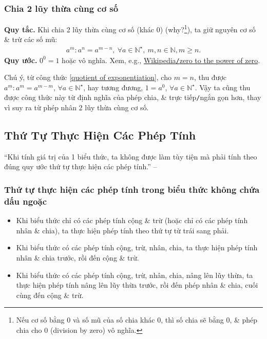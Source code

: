 \documentclass{article}
\numberwithin{equation}{section}
\begin{document}
\subsubsection{Chia 2 lũy thừa cùng cơ số}
\textbf{Quy tắc.} Khi chia 2 lũy thừa cùng cơ số (khác $0$) (why?\footnote{Nếu cơ số bằng 0 và số mũ của số chia khác 0, thì số chia sẽ bằng 0, \& phép chia cho 0 (division by zero) vô nghĩa.}), ta giữ nguyên cơ số \& trừ các số mũ:
\begin{align}
	\label{quotient of exponentiation}
	\boxed{a^m:a^n = a^{m-n},\ \forall a\in\mathbb{N}^\star,\ m,n\in\mathbb{N},m\ge n.}
\end{align}
\textbf{Quy ước.} $0^0 = 1$ hoặc vô nghĩa. Xem, e.g., \href{https://en.wikipedia.org/wiki/Zero_to_the_power_of_zero}{Wikipedia\texttt{/}zero to the power of zero}.

Chú ý, từ công thức \eqref{quotient of exponentiation}, cho $m = n$, thu được $a^m:a^m = a^{m - m}$, $\forall a\in\mathbb{N}^\star$, hay tương đương, $1 = a^0$, $\forall a\in\mathbb{N}^\star$. Vậy ta cũng thu được công thức này từ định nghĩa của phép chia, \& trực tiếp\texttt{/}ngắn gọn hơn, thay vì suy ra từ phép nhân 2 lũy thừa cùng cơ số.

\subsection{Thứ Tự Thực Hiện Các Phép Tính}
``Khi tính giá trị của 1 biểu thức, ta không được làm tùy tiện mà phải tính theo đúng quy ước thứ tự thực hiện các phép tính.'' -- \cite[p. 26]{Thai_Anh_Dat_Ha_Loan_Nam_Quang_Toan_6_tap_2}

\subsubsection{Thứ tự thực hiện các phép tính trong biểu thức không chứa dấu ngoặc}
\begin{tcolorbox}
	\begin{itemize}
		\item Khi biểu thức chỉ có các phép tính cộng \& trừ (hoặc chỉ có các phép tính nhân \& chia), ta thực hiện phép tính theo thứ tự từ trái sang phải.
		\item Khi biểu thức có các phép tính cộng, trừ, nhân, chia, ta thực hiện phép tính nhân \& chia trước, rồi đến cộng \& trừ.
		\item Khi biểu thức có các phép tính cộng, trừ, nhân, chia, nâng lên lũy thừa, ta thực hiện phép tính nâng lên lũy thừa trước, rồi đến phép nhân \& chia, cuối cùng đến cộng \& trừ.
	\end{itemize}
\end{tcolorbox}
\end{document}
